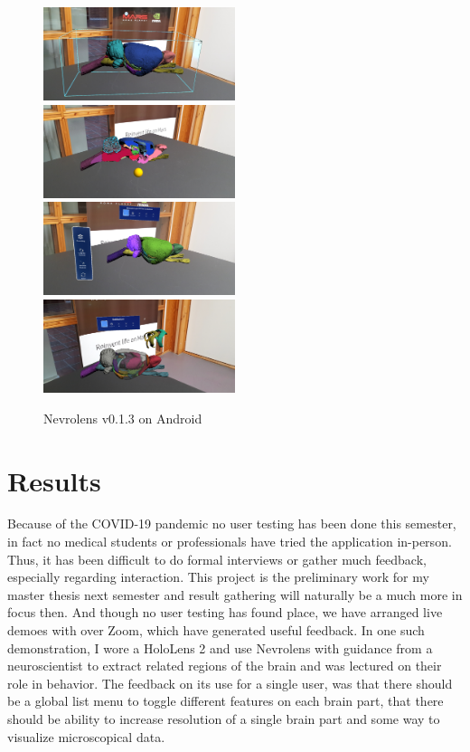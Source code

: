 \begin{figure}[h]\label{fig:nevrolens_android}
    \includegraphics[width=0.5\textwidth]{fig/nevrolens/android_zoom_large.jpg}
    \includegraphics[width=0.5\textwidth]{fig/nevrolens/android_clipping.jpg}
    \includegraphics[width=0.5\textwidth]{fig/nevrolens/android_palmmenu.jpg}
    \includegraphics[width=0.5\textwidth]{fig/nevrolens/android_partsout.jpg}
    \caption{Nevrolens v0.1.3 on Android}
\end{figure}





\section{Results}

Because of the COVID-19 pandemic no user testing has been done this semester, in fact no medical students or professionals have tried the application in-person. Thus, it has been difficult to do formal interviews or gather much feedback, especially regarding interaction. This project is the preliminary work for my master thesis next semester and result gathering will naturally be a much more in focus then. And though no user testing has found place, we have arranged live demoes with  over Zoom, which have generated useful feedback. 
In one such demonstration, I wore a HoloLens 2 and use Nevrolens with guidance from a neuroscientist to extract related regions of the brain and was lectured on their role in behavior. 
The feedback on its use for a single user, was that there should be a global list menu to toggle different features on each brain part, that there should be ability to increase resolution of a single brain part and some way to visualize microscopical data. 





